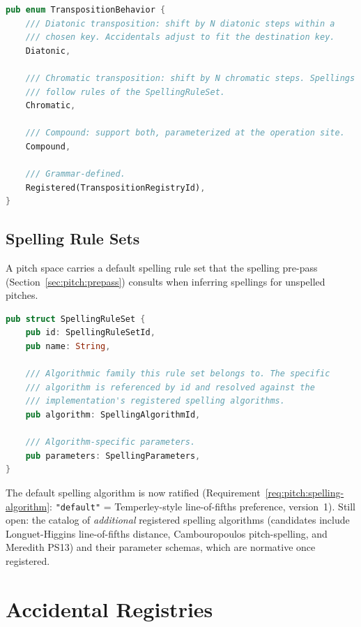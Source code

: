 \documentclass[11pt,letterpaper]{report}
\begin{document}
\begin{lstlisting}[language=Rust]
pub enum TranspositionBehavior {
    /// Diatonic transposition: shift by N diatonic steps within a
    /// chosen key. Accidentals adjust to fit the destination key.
    Diatonic,

    /// Chromatic transposition: shift by N chromatic steps. Spellings
    /// follow rules of the SpellingRuleSet.
    Chromatic,

    /// Compound: support both, parameterized at the operation site.
    Compound,

    /// Grammar-defined.
    Registered(TranspositionRegistryId),
}
\end{lstlisting}

\subsection{Spelling Rule Sets}

A pitch space carries a default spelling rule set that the spelling
pre-pass (Section~\ref{sec:pitch:prepass}) consults when inferring
spellings for unspelled pitches.

\begin{lstlisting}[language=Rust]
pub struct SpellingRuleSet {
    pub id: SpellingRuleSetId,
    pub name: String,

    /// Algorithmic family this rule set belongs to. The specific
    /// algorithm is referenced by id and resolved against the
    /// implementation's registered spelling algorithms.
    pub algorithm: SpellingAlgorithmId,

    /// Algorithm-specific parameters.
    pub parameters: SpellingParameters,
}
\end{lstlisting}

\begin{openquestion}
  The default spelling algorithm is now ratified
  (Requirement~\ref{req:pitch:spelling-algorithm}:
  \texttt{"default"} = Temperley-style line-of-fifths preference,
  version~1). Still open: the catalog of \emph{additional}
  registered spelling algorithms (candidates include
  Longuet-Higgins line-of-fifths distance, Cambouropoulos
  pitch-spelling, and Meredith PS13) and their parameter schemas,
  which are normative once registered.
\end{openquestion}

\section{Accidental Registries}
\label{sec:tuning:accidentals}
\end{document}

